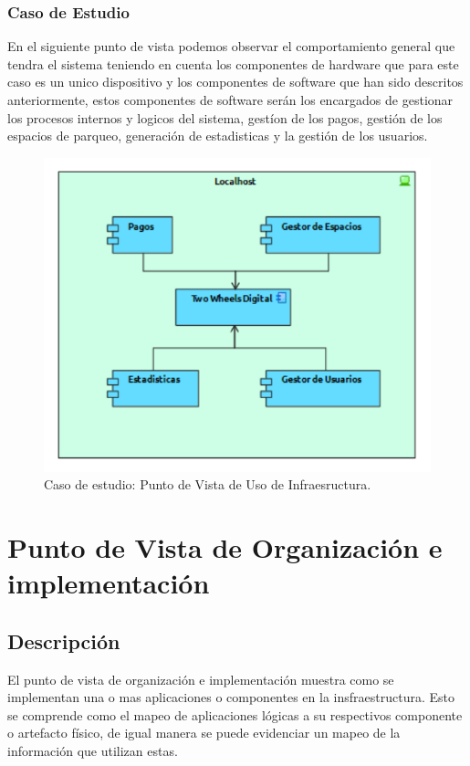 \subsubsection{Caso de Estudio}
En el siguiente punto de vista podemos observar el comportamiento general que tendra el sistema teniendo en cuenta los componentes de hardware que para este caso es un unico dispositivo y los componentes de software que han sido descritos anteriormente, estos componentes de software serán los encargados de gestionar los procesos internos y logicos del sistema, gestíon de los pagos, gestión de los espacios de parqueo, generación de estadisticas y la gestión de los usuarios.
\begin{figure}[h]
	\centering
	\includegraphics[width=1.0\textwidth]{imagenes/Caso_Estudio/Tecnologia/uso_infraestructura.PDF}
	\caption{Caso de estudio: Punto de Vista de Uso de Infraesructura.}
	\label{fig:gap_analysis}
\end{figure}


\section{Punto de Vista de Organización e implementación}
\subsection{Descripción}
El punto de vista de organización e implementación muestra como se implementan una o mas aplicaciones o componentes en la insfraestructura. Esto se comprende como el mapeo de aplicaciones lógicas a su respectivos componente o artefacto físico, de igual manera se puede evidenciar un mapeo de  la información que utilizan estas.

